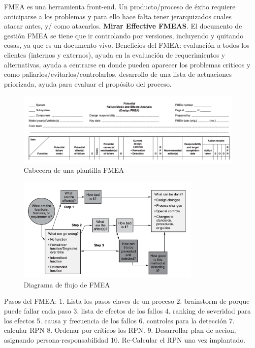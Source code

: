 \documentclass[]{article}
\begin{document}
FMEA es una herramienta front-end. Un producto/proceso de éxito requiere anticiparse a los problemas y para ello hace falta tener jerarquizados cuales atacar antes, y/ como atacarlos. \textbf{Mirar Effective FMEAS}. El documento de gestión FMEA se tiene que ir controlando por versiones, incluyendo y quitando cosas, ya que es un documento vivo. Beneficios del FMEA: evaluación a todos los clientes (internos y externos), ayuda en la evaluación de requerimientos y alternativas, ayuda a centrarse en donde pueden aparecer los problemas criticos y como paliarlos/evitarlos/controlarlos, desarrollo de una lista de actuaciones priorizada, ayuda para evaluar el propósito del proceso.

\begin{figure}[ht!]
	\centering
	\includegraphics[width=170mm]{imagenes/PlantillaFMEA.png}
	\caption{Cabecera de una plantilla FMEA}
	\label{fig:PlantillaFMEA}
\end{figure}

\begin{figure}[ht!]
	\centering
	\includegraphics[width=90mm]{imagenes/FMEAFlowchart.png}
	\caption{Diagrama de flujo de FMEA}
	\label{fig:FMAFlowchart}
\end{figure}

Pasos del FMEA: 1. Lista los pasos claves de un proceso 2. brainstorm de porque puede fallar cada paso 3. lista de efectos de los fallos 4. ranking de severidad para los efectos 5. causa y frecuencia de los fallos 6. controles para la detección 7. calcular RPN 8. Ordenar por críticos los RPN. 9. Desarrollar plan de accion, asignando persona-responsabilidad 10. Re-Calcular el RPN una vez implantado.
\end{document}
